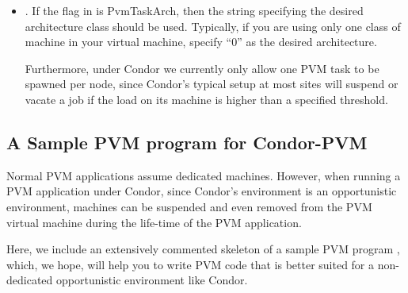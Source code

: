 \begin{itemize}
\item {}.  If  the flag in  is 
  PvmTaskArch, then the string specifying the desired architecture
  class should be used.  Typically, if you are using only one class of
  machine in your virtual machine, specify ``0'' as the desired architecture.

  Furthermore, under Condor we currently only allow one
  PVM task to be spawned per node, since Condor's typical setup at most 
  sites will suspend or vacate
  a job if the load on its machine is higher than a specified
  threshold.

\end{itemize}

\subsection{A Sample PVM program for Condor-PVM}

Normal PVM applications assume dedicated machines.  However, when running a
PVM application under Condor, since Condor's environment is an
opportunistic environment, machines can be suspended and even removed
from the PVM virtual machine during the life-time of the PVM
application.  

Here, we include an extensively commented skeleton of a sample PVM
program , which, we hope, will help you to
write PVM code that is better suited for a non-dedicated opportunistic
environment like Condor.

